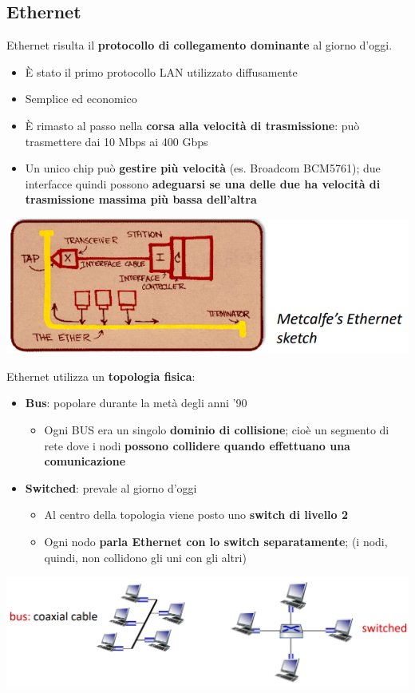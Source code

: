 \documentclass[12pt]{article}
\begin{document}
\subsection{Ethernet}
Ethernet risulta il \textbf{protocollo di collegamento dominante} al giorno d'oggi.
\begin{itemize}
    \item È stato il primo protocollo LAN utilizzato diffusamente 
    \item Semplice ed economico
    \item È rimasto al passo nella \textbf{corsa alla velocità di trasmissione}: può trasmettere dai 10 Mbps ai 400 Gbps
    \item Un unico chip può \textbf{gestire più velocità} (es. Broadcom BCM5761); due interfacce quindi possono \textbf{adeguarsi se una delle due ha velocità di trasmissione massima più bassa dell'altra}
\end{itemize}
\begin{center}
    \includegraphics[width =0.70\linewidth]{Images/135.png}
\end{center}
Ethernet utilizza un \textbf{topologia fisica}:
\begin{itemize}
    \item \textbf{Bus}: popolare durante la metà degli anni '90
    \begin{itemize}
        \item Ogni BUS era un singolo \textbf{dominio di collisione}; cioè un segmento di rete dove i nodi \textbf{possono collidere quando effettuano una comunicazione}
    \end{itemize}
    \item \textbf{Switched}: prevale al giorno d'oggi
    \begin{itemize}
        \item Al centro della topologia viene posto uno \textbf{switch di livello 2}
        \item Ogni nodo \textbf{parla Ethernet con lo switch separatamente}; (i nodi, quindi, non collidono gli uni con gli altri)
    \end{itemize}
\end{itemize}
\begin{center}
    \includegraphics[width =0.90\linewidth]{Images/136.png}
\end{center}
\end{document}
